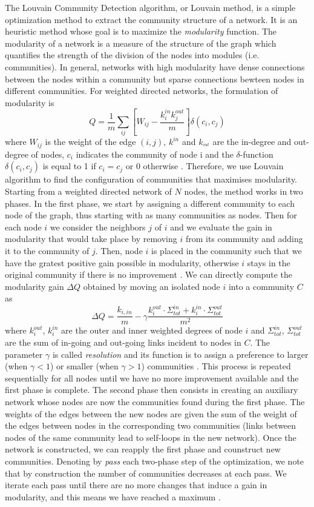 The Louvain Community Detection algorithm, or Louvain method, is a simple optimization method to extract the community structure of a network. It is an heuristic method whose goal is to maximize the \textit{modularity} function. The modularity of a network is a measure of the structure of the graph which quantifies the strength of the division of the nodes into modules (i.e. communities). In general, networks with high modularity have dense connections between the nodes within a community but sparse connections bewteen nodes in different communities.
For weighted directed networks, the formulation of modularity is 
\[
    Q = \frac{1}{m} \sum_{ij} \left[ W_{ij} - \frac{k_i^{in}k_j^{out}}{m} \right] \delta(c_i,c_j)
\]
where $W_{ij}$ is the weight of the edge $(i,j)$, $k^{in}$ and $k_^{out}$
are the in-degree and out-degree of nodes, $c_i$ indicates the community of node i and the $\delta$-function $\delta(c_i,c_j)$ is equal to 1 if $c_i=c_j$ or $0$ otherwise \cite{leicht2008community}.
Therefore, we use Louvain algorithm to find the configuration of communities that maximises modularity. Starting from a weighted directed network of $N$ nodes, the method works in two phases. 
In the first phase, we start by assigning a different community to each node of the graph, thus starting with as many communities as nodes. Then for each node $i$ we consider the neighbors $j$ of $i$ and we evaluate the gain in modularity that would take place by removing $i$ from its community and adding it to the community of $j$. Then, node $i$ is placed in the community such that we have the gratest positive gain possible in modularity, otherwise $i$ stays in the original community if there is no improvement \cite{blondel2008louvain}. We can directly compute the modularity gain $\Delta Q$ obtained by moving an isolated node \(i\) into a community \(C\) as
\[
    \Delta Q = \frac{k_{i,in}}{m} - \gamma\frac{k_i^{out} \cdot\Sigma_{tot}^{in} + k_i^{in} \cdot \Sigma_{tot}^{out}}{m^2}
\]
where \(k_i^{out}\), \(k_i^{in}\) are the outer and inner weighted degrees of node \(i\) and \(\Sigma_{tot}^{in}\), \(\Sigma_{tot}^{out}\) are the sum of in-going and out-going links incident to nodes in \(C\).
The parameter $\gamma$ is called \textit{resolution} and its function is to assign a preference to larger (when $\gamma < 1$) or smaller (when $\gamma > 1$) communities \cite{hagberg2008networkx}.
This process is repeated sequentially for all nodes until we have no more improvement available and the first phase is complete.
The second phase then consists in creating an auxiliary network whose nodes are now the communities found during the first phase. The weights of the edges between the new nodes are given the sum of the weight of the edges between nodes in the corresponding two communities (links between nodes of the same community lead to self-loops in the new network). Once the network is constructed, we can reapply the first phase and counstruct new communities. Denoting by \textit{pass} each two-phase step of the optimization, we note that by construction the number of communities decreases at each pass. We iterate each pass until there are no more changes that induce a gain in modularity, and this means we have reached a maximum \cite{blondel2008louvain}.


